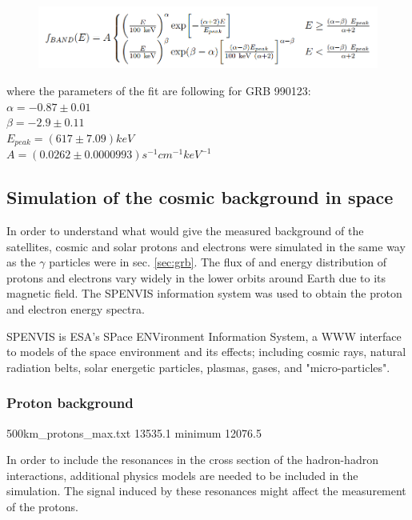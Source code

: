 \documentclass[12pt, a4paper,titlepage]{article}
\numberwithin{equation}{section}
\numberwithin{figure}{section}
\begin{document}
\begin{figure}[h!]
\begin{center}
\includegraphics[width=130.0mm]{images/band_function.png}
\label{eq:bandfunc}
\end{center}
\end{figure}

where the parameters of the fit are following for GRB 990123:\\
$\alpha = -0.87 \pm 0.01 $\\
$\beta = -2.9 \pm 0.11$\\
$E_{peak} = (617 \pm 7.09) keV$\\
$A= (0.0262 \pm 0.0000993) s^{-1}cm^{-1}keV^{-1}$\\


\subsection{Simulation of the cosmic background in space}

In order to understand what would give the measured background of the satellites, cosmic and solar protons and electrons were simulated in the same way as the $\gamma$ particles were in sec. \ref{sec:grb}. The flux of and energy distribution of protons and electrons vary widely in the lower orbits around Earth due to its magnetic field. The SPENVIS \cite{spenvis} information system was used to obtain the proton and electron energy spectra.

SPENVIS is ESA's SPace ENVironment Information System, a WWW interface to models of the space environment and its effects; including cosmic rays, natural radiation belts, solar energetic particles, plasmas, gases, and "micro-particles".

\subsubsection{Proton background}


500km\_protons\_max.txt 
13535.1
minimum
12076.5



In order to include the resonances in the cross section of the hadron-hadron interactions, additional physics models are needed to be included in the simulation. The signal induced by these resonances might affect the measurement of the protons.
\end{document}
